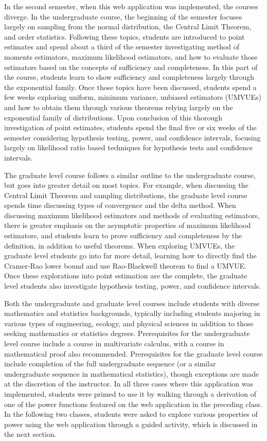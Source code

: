 \documentclass{TISE}
\begin{document}
In the second semester, when this web application was implemented, the courses diverge. In the undergraduate course, the beginning of the semester focuses largely on sampling from the normal distribution, the Central Limit Theorem, and order statistics. Following these topics, students are introduced to point estimates and spend about a third of the semester investigating method of moments estimators, maximum likelihood estimators, and how to evaluate those estimators based on the concepts of sufficiency and completeness. In this part of the course, students learn to show sufficiency and completeness largely through the exponential family. Once those topics have been discussed, students spend a few weeks exploring uniform, minimum variance, unbiased estimators (UMVUEs) and how to obtain them through various theorems relying largely on the exponential family of distributions. Upon conclusion of this thorough investigation of point estimates, students spend the final five or six weeks of the semester considering hypothesis testing, power, and confidence intervals, focusing largely on likelihood ratio based techniques for hypothesis tests and confidence intervals.

The graduate level course follows a similar outline to the undergraduate course, but goes into greater detail on most topics. For example, when discussing the Central Limit Theorem and sampling distributions, the graduate level course spends time discussing types of convergence and the delta method. When discussing maximum likelihood estimators and methods of evaluating estimators, there is greater emphasis on the asymptotic properties of maximum likelihood estimators, and students learn to prove sufficiency and completeness by the definition, in addition to useful theorems. When exploring UMVUEs, the graduate level students go into far more detail, learning how to directly find the Cramer-Rao lower bound and use Rao-Blackwell theorem to find a UMVUE. Once these explorations into point estimation are the complete, the graduate level students also investigate hypothesis testing, power, and confidence intervals. 

Both the undergraduate and graduate level courses include students with diverse mathematics and statistics backgrounds, typically including students majoring in various types of engineering, ecology, and physical sciences in addition to those seeking mathematics or statistics degrees. Prerequisites for the undergraduate level course include a course in multivariate calculus, with a course in mathematical proof also recommended. Prerequisites for the graduate level course include completion of the full undergraduate sequence (or a similar undergraduate sequence in mathematical statistics), though exceptions are made at the discretion of the instructor. In all three cases where this application was implemented, students were primed to use it by walking through a derivation of one of the power functions featured on the web application in the preceding class. In the following two classes, students were asked to explore various properties of power using the web application through a guided activity, which is discussed in the next section. 
\end{document}
